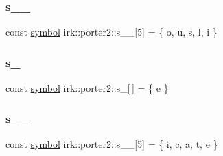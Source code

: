 \mbox{\label{namespaceirk_1_1porter2_ae5a1d06069b349fd9258ba4ad6d80d7e}} 
\subsubsection{\texorpdfstring{s\+\_\+\_}{s\_5\_9}}
{\footnotesize\ttfamily const \mbox{\hyperlink{namespaceirk_1_1porter2_afd04c4eb58a1dabcf8f3ab2d7e9f9ed5}{symbol}} irk\+::porter2\+::s\+\_\+\_\mbox{[}5\mbox{]} = \{ \textquotesingle{}o\textquotesingle{}, \textquotesingle{}u\textquotesingle{}, \textquotesingle{}s\textquotesingle{}, \textquotesingle{}l\textquotesingle{}, \textquotesingle{}i\textquotesingle{} \}\hspace{0.3cm}{\ttfamily [static]}}

\mbox{\label{namespaceirk_1_1porter2_a5c3d367f7a2ee5317bb4ecea860a8557}} 
\subsubsection{\texorpdfstring{s\+\_}{s\_6}}
{\footnotesize\ttfamily const \mbox{\hyperlink{namespaceirk_1_1porter2_afd04c4eb58a1dabcf8f3ab2d7e9f9ed5}{symbol}} irk\+::porter2\+::s\+\_\mbox{[}$\,$\mbox{]} = \{ \textquotesingle{}e\textquotesingle{} \}\hspace{0.3cm}{\ttfamily [static]}}

\mbox{\label{namespaceirk_1_1porter2_a72f9928fd5c42ef2b17723ad9645b7ad}} 
\subsubsection{\texorpdfstring{s\+\_\+\_}{s\_6\_0}}
{\footnotesize\ttfamily const \mbox{\hyperlink{namespaceirk_1_1porter2_afd04c4eb58a1dabcf8f3ab2d7e9f9ed5}{symbol}} irk\+::porter2\+::s\+\_\+\_\mbox{[}5\mbox{]} = \{ \textquotesingle{}i\textquotesingle{}, \textquotesingle{}c\textquotesingle{}, \textquotesingle{}a\textquotesingle{}, \textquotesingle{}t\textquotesingle{}, \textquotesingle{}e\textquotesingle{} \}\hspace{0.3cm}{\ttfamily [static]}}

